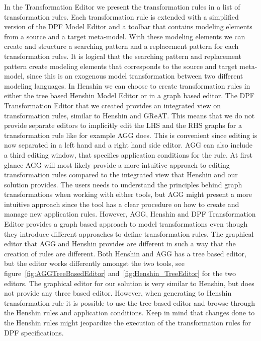 In the Transformation Editor we present the transformation rules in a list of
transformation rules. Each transformation rule is extended with a simplified
version of the DPF Model Editor and a toolbar that contains modeling elements
from a source and a target meta-model. With these modeling elements we can
create and structure a searching pattern and a replacement pattern for each
transformation rules. It is logical that the searching pattern and replacement
pattern create modeling elements that corresponds to the source and target
meta-model, since this is an exogenous model transformation between two
different modeling languages. In Henshin we can choose to create transformation
rules in either the tree based Henshin Model Editor or in a graph based editor.
The DPF Transformation Editor that we created provides an integrated view on
transformation rules, similar to Henshin and GReAT. This means that
we do not provide separate editors to implicitly edit the LHS and the RHS
graphs for a transformation rule like for example AGG does. This is convenient
since editing is now separated in a left hand and a right hand side editor. AGG
can also include a third editing window, that specifies application conditions
for the rule. At first glance AGG will most likely provide a more intuitive
approach to editing transformation rules compared to the integrated view that
Henshin and our solution provides. The users needs to understand the principles
behind graph transformations when working with either tools, but AGG might
present a more intuitive approach since the tool has a clear procedure on how
to create and manage new application rules. However, AGG, Henshin and DPF
Transformation Editor provides a graph based approach to model transformations
even though they introduce different approaches to define transformation rules.
The graphical editor that AGG and Henshin provides are different in such a way
that the creation of rules are different. Both Henshin and AGG has a tree based
editor, but the editor works differently amongst the two tools, see
figure~\ref{fig:AGGTreeBasedEditor} and~\ref{fig:Henshin_TreeEditor} for the
two editors. The graphical editor for our solution is very similar to Henshin,
but does not provide any three based editor. However, when generating to
Henshin transformation rule it is possible to use the tree based editor and
browse through the Henshin rules and application conditions. Keep in mind that
changes done to the Henshin rules might jeopardize the execution of the
transformation rules for DPF specifications.

